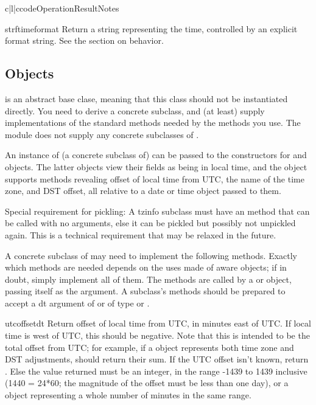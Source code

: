 \begin{tableiii}{c|l|c}{code}{Operation}{Result}{Notes}
\begin{methoddesc}{strftime}{format}
    Return a string representing the time, controlled by an explicit
    format string.  See the section on  behavior.
\end{methoddesc}


\subsection{ Objects \label{datetime-tzinfo}}

 is an abstract base clase, meaning that this class
should not be instantiated directly.  You need to derive a concrete
subclass, and (at least) supply implementations of the standard
 methods needed by the  methods you
use. The  module does not supply any concrete
subclasses of .

An instance of (a concrete subclass of)  can be passed
to the constructors for  and  objects.
The latter objects view their fields as being in local time, and the
 object supports methods revealing offset of local time
from UTC, the name of the time zone, and DST offset, all relative to a
date or time object passed to them.

Special requirement for pickling:  A tzinfo subclass must have an
 method that can be called with no arguments, else it
can be pickled but possibly not unpickled again.  This is a technical
requirement that may be relaxed in the future.

A concrete subclass of  may need to implement the
following methods.  Exactly which methods are needed depends on the
uses made of aware  objects; if in doubt, simply
implement all of them.  The methods are called by a 
or  object, passing itself as the argument.  A
 subclass's methods should be prepared to accept a dt
argument of  or of type  or
.

\begin{methoddesc}{utcoffset}{dt}
    Return offset of local time from UTC, in minutes east of UTC.  If
    local time is west of UTC, this should be negative.  Note that this
    is intended to be the total offset from UTC; for example, if a
     object represents both time zone and DST adjustments,
     should return their sum.  If the UTC offset
    isn't known, return .  Else the value returned must be
    an integer, in the range -1439 to 1439 inclusive (1440 = 24*60;
    the magnitude of the offset must be less than one day), or a
     object representing a whole number of minutes
    in the same range.
\end{methoddesc}


\end{tableiii}
